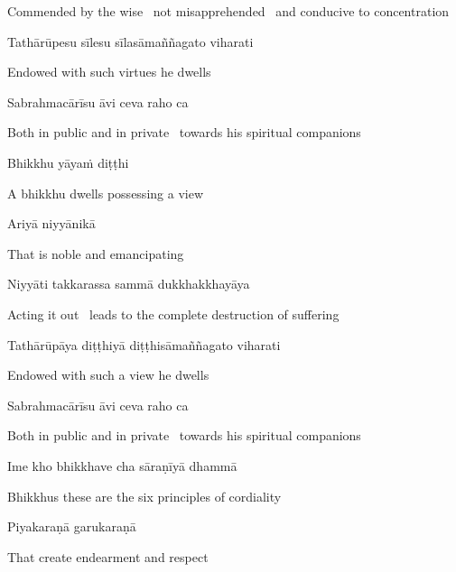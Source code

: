\begin{english-hang}
  Commended by the wise \breathmark\ not misapprehended \breathmark\ and conducive to concentration
\end{english-hang}

Tathārūpesu sīlesu sīlasāmaññagato viharati

\begin{english}
  Endowed with such virtues he dwells
\end{english}

Sabrahmacārīsu āvi ceva raho ca

\begin{english}
  Both in public and in private \breathmark\ towards his spiritual companions
\end{english}

Bhikkhu yāyaṁ diṭṭhi

\begin{english}
  A bhikkhu dwells possessing a view
\end{english}

Ariyā niyyānikā

\begin{english}
  That is noble and emancipating
\end{english}

Niyyāti takkarassa sammā dukkhakkhayāya

\begin{english}
  Acting it out \breathmark\ leads to the complete destruction of suffering
\end{english}

Tathārūpāya diṭṭhiyā diṭṭhisāmaññagato viharati

\begin{english}
  Endowed with such a view he dwells
\end{english}

Sabrahmacārīsu āvi ceva raho ca

\begin{english}
  Both in public and in private \breathmark\ towards his spiritual companions
\end{english}

Ime kho bhikkhave cha sāraṇīyā dhammā

\begin{english}
  Bhikkhus these are the six principles of cordiality
\end{english}

Piyakaraṇā garukaraṇā

\begin{english}
  That create endearment and respect
\end{english}

